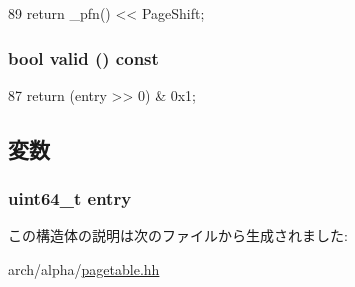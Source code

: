 \begin{DoxyCode}
89 { return _pfn() << PageShift; }
\end{DoxyCode}
\hypertarget{structAlphaISA_1_1PageTableEntry_a8d985300b138b6c5556ab17ed4df3b38}{
\subsubsection[{valid}]{\setlength{\rightskip}{0pt plus 5cm}bool valid () const}}
\label{structAlphaISA_1_1PageTableEntry_a8d985300b138b6c5556ab17ed4df3b38}



\begin{DoxyCode}
87 { return (entry >>  0) & 0x1; }
\end{DoxyCode}


\subsection{変数}
\hypertarget{structAlphaISA_1_1PageTableEntry_a6aac0a1a7d70f8270f9bb1222445f370}{
\subsubsection[{entry}]{\setlength{\rightskip}{0pt plus 5cm}uint64\_\-t {\bf entry}}}
\label{structAlphaISA_1_1PageTableEntry_a6aac0a1a7d70f8270f9bb1222445f370}


この構造体の説明は次のファイルから生成されました:\begin{DoxyCompactItemize}
\item 
arch/alpha/\hyperlink{alpha_2pagetable_8hh}{pagetable.hh}\end{DoxyCompactItemize}

